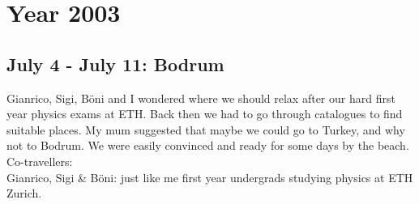 \chapter{Year 2003}
\label{2003}

\section{July 4 - July 11: Bodrum}
\label{2003:Bodrum}

Gianrico, Sigi, B\"oni and I wondered where we should relax after our hard first year physics exams at ETH. Back then we had to go through catalogues to find suitable places. My mum suggested that maybe we could go to Turkey, and why not to Bodrum. We were easily convinced and ready for some days by the beach.\\

Co-travellers:\\
Gianrico, Sigi \& B\"oni: just like me first year undergrads studying physics at ETH Zurich.\\

